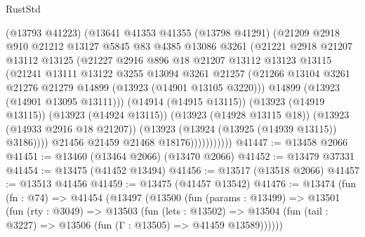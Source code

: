 \begin{lexlean}{RustStd}
\begin{coremodule}
                      (@13793 @41223)
                      (@13641
                        @41353
                        @41355
                        (@13798 @41291)
                        (@21209
                          @2918
                          @910
                          @21212
                          @13127
                          @5845
                          @83
                          @4385
                          @13086
                          @3261
                          (@21221
                            @2918
                            @21207
                            @13112
                            @13125
                            (@21227
                              @2916
                              @896
                              @18
                              @21207
                              @13112
                              @13123
                              @13115
                              (@21241
                                @13111
                                @13122
                                @3255
                                @13094
                                @3261
                                @21257
                                (@21266
                                  @13104
                                  @3261
                                  @21276
                                  @21279
                                  @14899
                                  (@13923 (@14901 @13105 @3220)))
                                @14899
                                (@13923 (@14901 @13095 @13111)))
                              (@14914 (@14915 @13115))
                              (@13923 (@14919 @13115))
                              (@13923 (@14924 @13115))
                              (@13923 (@14928 @13115 @18))
                              (@13923 (@14933 @2916 @18 @21207))
                              (@13923 (@13924 (@13925 (@14939 @13115)) @3186))))
                          @21456
                          @21459
                          @21468
                          @18176)))))))))))
@41447 := @13458 @2066
@41451 := @13460 (@13464 @2066) (@13470 @2066)
@41452 := @13479 @37331
@41454 := @13475 (@41452 @13494)
@41456 := @13517 (@13518 @2066)
@41457 := @13513 @41456
@41459 := @13475 (@41457 @13542)
@41476 := @13474
    (fun (fn : @74) =>
    @41454
      (@13497
        (@13500
          (fun (params : @13499) =>
          @13501
            (fun (rty : @3049) =>
            @13503
              (fun (lets : @13502) =>
              @13504 (fun (tail : @3227) => @13506 (fun (Γ : @13505) => @41459 @13589))))))

\end{coremodule}
\end{lexlean}
